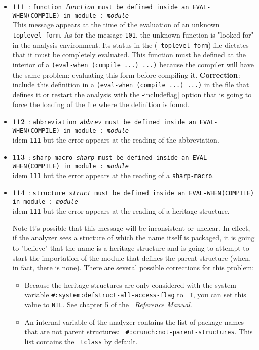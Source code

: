 \begin{itemize}
\item {\Large {\bf 111}}\ : {\tt function {\em function} must be defined inside
an EVAL-WHEN(COMPILE) in module : {\em module}}\\
This message appears at the time of the evaluation of an unknown {\tt
toplevel-form}.  As for the message {\tt 101}, the unknown function is "looked for" in the analysis environment.  Its status in the ({\tt
toplevel-form}) file dictates that it must be completely evaluated.  This function must be defined at the interior of a {\tt (eval-when
(compile ...) ...)} because the compiler will have the same problem:  evaluating this form before compiling it.
{\bf Correction}\,: include this definition in a {\tt (eval-when
(compile ...) ...)} in the file that defines it or restart the analysis with the \|-includeflag| option that is going to force the loading of the file where the definition is found. 

\item {\Large {\bf 112}}\ : {\tt abbreviation {\em abbrev} must be defined
inside an EVAL-WHEN(COMPILE) in module : {\em module}}\\
idem {\tt 111} but the error appears at the reading of the abbreviation.

\item {\Large {\bf 113}}\ : {\tt sharp macro {\em sharp} must be defined inside
an EVAL-WHEN(COMPILE) in module : {\em module}}\\
idem {\tt 111} but the error appears at the reading of a {\tt sharp-macro}.

\item {\Large {\bf 114}}\ : {\tt structure {\em struct} must be defined inside
an EVAL-WHEN(COMPILE) in module : {\em module}}\\
idem {\tt 111} but the error appears at the reading of a heritage structure. 

\begin{Side}{Note}
It's possible that this message will be inconsistent or unclear.
In effect, if the analyzer sees a stucture of which the name 
itself is packaged, it is going to "believe" that the name 
is a heritage structure and is going to attempt 
to start the importation of the module that defines 
the parent structure (when, in fact, there is none).  
There are several possible corrections for this problem:
\begin{itemize}
\item Because the heritage structures are only considered 
with the system variable 
{\tt \#:system:defstruct-all-access-flag} to {\tt
T}, you can set this value to {\tt NIL}.
See chapter 5 of the \LeLisp\ {\em Reference Manual}.
\item An internal variable of the analyzer contains the list 
of package names that are not parent structures:  {\tt
\#:crunch:not-parent-structures}.  This list contains the {\tt
tclass} by default.
\end{itemize}
\end{Side}


\end{itemize}
